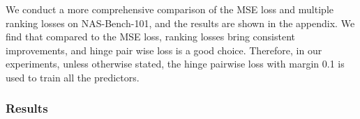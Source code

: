 \documentclass[runningheads]{llncs}
\begin{document}
We conduct a more comprehensive comparison of the MSE loss and multiple ranking losses on NAS-Bench-101, and the results are shown in the appendix. We find that compared to the MSE loss, ranking losses bring consistent improvements, and hinge pair wise loss is a good choice. Therefore, in our experiments, unless otherwise stated, the hinge pairwise loss with margin 0.1 is used to train all the predictors.


\subsubsection{Results}
\label{sec:exp-nasnbech-gates}


\begin{table*}[tb]
\caption{The Kendall’s Tau of using different encoders on the NAS-Bench-101 dataset. The first 90\% (381262) architectures in the dataset are used as the training data, and the other 42362 architectures are used as the testing data}
  
\label{table:gates-nb101}
\begin{center}
\end{center}
\end{table*}
\end{document}
